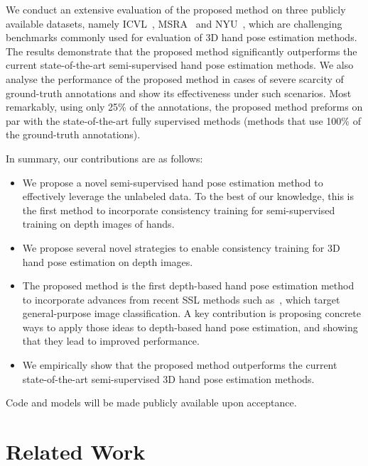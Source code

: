 \documentclass{article}
\begin{document}
\par
We conduct an extensive evaluation of the proposed method on three publicly available datasets, namely ICVL~\cite{tang2014latent}, MSRA~\cite{sun2015cascaded} and NYU~\cite{tompson2014real}, which are challenging benchmarks commonly used for evaluation of 3D hand pose estimation methods. The results demonstrate that the proposed method significantly outperforms the current state-of-the-art semi-supervised hand pose estimation methods. We also analyse the performance of the proposed method in cases of severe scarcity of ground-truth annotations and show its effectiveness under such scenarios. Most remarkably, using only 25\% of the annotations, the proposed method preforms on par with the state-of-the-art fully supervised methods (methods that use 100\% of the ground-truth annotations).
\par
In summary, our contributions are as follows:
\begin{itemize}
  \item We propose a novel semi-supervised hand pose estimation method to effectively leverage the unlabeled data. To the best of our knowledge, this is the first method to incorporate consistency training for semi-supervised training on depth images of hands. 
  \item We propose several novel strategies to enable consistency training for 3D hand pose estimation on depth images.
  \item The proposed method is the first depth-based hand pose estimation method to incorporate advances from recent SSL methods such as~\cite{sohn2020fixmatch,xie2019unsupervised,cai2021exponential}, which target general-purpose image classification. A key contribution is proposing concrete ways to apply those ideas to depth-based hand pose estimation, and showing that they lead to improved performance.
  \item We empirically show that the proposed method outperforms the current state-of-the-art semi-supervised 3D hand pose estimation methods.\end{itemize}
Code and models will be made publicly available upon acceptance.

\section{Related Work}
\end{document}
